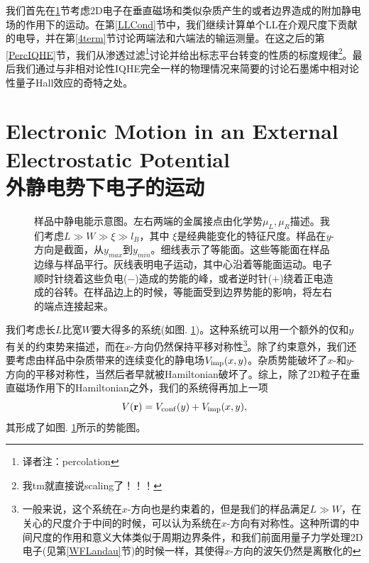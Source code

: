 \documentclass[10pt]{book}
\newcommand{\br}{{\bf r}}
\newcommand{\beq}{\begin{equation}}
\newcommand{\eeq}{\end{equation}}
\begin{document}
我们首先在\ref{ExtPot}节考虑2D电子在垂直磁场和类似杂质产生的或者边界造成的附加静电场的作用下的运动。在第\ref{LLCond}节中，我们继续计算单个LL在介观尺度下贡献的电导，并在第\ref{4term}节讨论两端法和六端法的输运测量。在这之后的第\ref{PercIQHE}节，我们从渗透过滤\footnote{译者注：percolation}讨论并给出标志平台转变的性质的标度规律\footnote{我tm就直接说scaling了！！！}。最后我们通过与非相对论性IQHE完全一样的物理情况来简要的讨论石墨烯中相对论性量子Hall效应的奇特之处。



\section[外静电势下电子的运动]{Electronic Motion in an External Electrostatic Potential\\\bf 外静电势下电子的运动}
\label{ExtPot}




\begin{figure}
\begin{center}
\end{center}
\caption{样品中静电能示意图。左右两端的金属接点由化学势$\mu_L, \mu_R$描述。我们考虑$L\gg W \gg \xi \gg l_B$，其中 
$\xi$是经典能变化的特征尺度。样品在$y$-方向是截面，从$y_{max}$到$y_{min}$。细线表示了等能面。这些等能面在样品边缘与样品平行。灰线表明电子运动，其中心沿着等能面运动。电子顺时针绕着这些负电($-$)造成的势能的峰，或者逆时针($+$)绕着正电造成的谷转。在样品边上的时候，等能面受到边界势能的影响，将左右的端点连接起来。}
\label{fig11}
\end{figure}


我们考虑长$L$比宽$W$要大得多的系统(如图. \ref{fig11})。这种系统可以用一个额外的仅和$y$有关的约束势来描述，而在$x$-方向仍然保持平移对称性\footnote{一般来说，这个系统在$x$-方向也是约束着的，但是我们的样品满足$L\gg W$，在关心的尺度介于中间的时候，可以认为系统在$x$-方向有对称性。这种所谓的中间尺度的作用和意义大体类似于周期边界条件，和我们前面用量子力学处理2D电子(见第\ref{WFLandau}节)的时候一样，其使得$x$-方向的波矢仍然是离散化的}。除了约束意外，我们还要考虑由样品中杂质带来的连续变化的静电场$V_{\rm imp}(x,y)$。杂质势能破坏了$x$-和$y$-方向的平移对称性，当然后者早就被Hamiltonian破坏了。综上，除了2D粒子在垂直磁场作用下的Hamiltonian之外，我们的系统得再加上一项
\beq\label{extPot}
V(\br) = V_{\rm conf}(y) + V_{\rm imp}(x,y),
\eeq
其形成了如图. \ref{fig11}所示的势能图。
\end{document}
